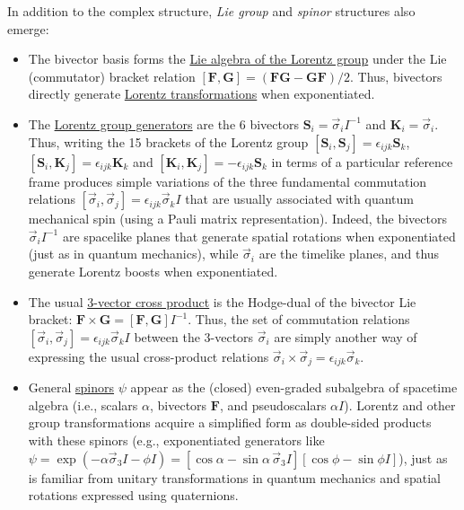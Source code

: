 \documentclass[1p,sort&compress]{elsarticle}
\numberwithin{equation}{section}
\newcommand{\rv}[1]{\vec{#1}}
\newcommand{\bv}[1]{\mathbf{#1}}
\begin{document}
In addition to the complex structure, \emph{Lie group} and \emph{spinor} structures also emerge:
\begin{itemize}
  \item The bivector basis forms the \uline{Lie algebra of the Lorentz group} under the Lie (commutator) bracket relation $[\bv{F},\bv{G}] = (\bv{F}\bv{G} - \bv{G}\bv{F})/2$.  Thus, bivectors directly generate \uline{Lorentz transformations} when exponentiated.
  \item The \uline{Lorentz group generators} are the 6 bivectors $\bv{S}_i = \rv{\sigma}_i I^{-1}$ and $\bv{K}_i = \rv{\sigma}_i$.  Thus, writing the 15 brackets of the Lorentz group $[\bv{S}_i,\bv{S}_j] = \epsilon_{ijk}\bv{S}_k$, $[\bv{S}_i,\bv{K}_j] = \epsilon_{ijk}\bv{K}_k$ and $[\bv{K}_i,\bv{K}_j] = -\epsilon_{ijk}\bv{S}_k $ in terms of a particular reference frame produces simple variations of the three fundamental commutation relations $[\rv{\sigma}_i,\rv{\sigma}_j] = \epsilon_{ijk}\rv{\sigma}_k I$ that are usually associated with quantum mechanical spin (using a Pauli matrix representation).  Indeed, the bivectors $\rv{\sigma}_i I^{-1}$ are spacelike planes that generate spatial rotations when exponentiated (just as in quantum mechanics), while $\rv{\sigma}_i$ are the timelike planes, and thus generate Lorentz boosts when exponentiated.
  \item The usual \uline{3-vector cross product} is the Hodge-dual of the bivector Lie bracket: $\bv{F}\times\bv{G} = [\bv{F},\bv{G}]I^{-1}$.  Thus, the set of commutation relations $[\rv{\sigma}_i,\rv{\sigma}_j] = \epsilon_{ijk}\rv{\sigma}_k I$ between the 3-vectors $\rv{\sigma}_i$ are simply another way of expressing the usual cross-product relations $\rv{\sigma}_i \times \rv{\sigma}_j = \epsilon_{ijk}\rv{\sigma}_k$.
  \item General \uline{spinors} $\psi$ appear as the (closed) even-graded subalgebra of spacetime algebra (i.e., scalars $\alpha$, bivectors $\bv{F}$, and pseudoscalars $\alpha I$). Lorentz and other group transformations acquire a simplified form as double-sided products with these spinors (e.g., exponentiated generators like $\psi = \exp(-\alpha \rv{\sigma}_3 I - \phi I) = [\cos\alpha - \sin\alpha\,\rv{\sigma}_3 I][\cos\phi - \sin\phi I]$), just as is familiar from unitary transformations in quantum mechanics and spatial rotations expressed using quaternions.
\end{itemize}
\end{document}
